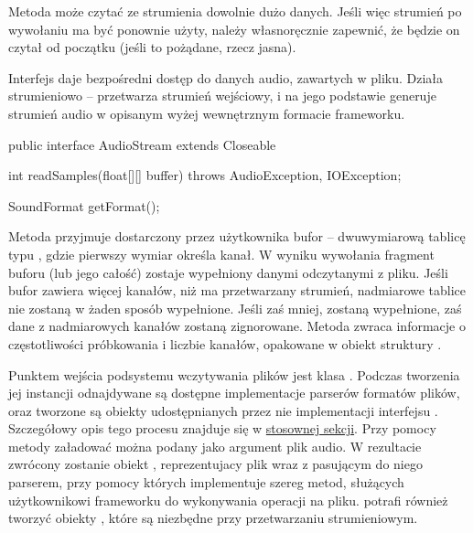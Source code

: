 \begin{Note}
Metoda  może czytać ze strumienia dowolnie dużo danych. Jeśli więc strumień po
wywołaniu ma być ponownie użyty, należy własnoręcznie zapewnić, że będzie on czytał od początku
(jeśli to pożądane, rzecz jasna).  
\end{Note}

Interfejs  daje bezpośredni dostęp do danych audio, zawartych w pliku. Działa
strumieniowo -- przetwarza strumień wejściowy, i na jego podstawie generuje strumień audio w
opisanym wyżej wewnętrznym formacie frameworku.

\begin{java}
public interface AudioStream extends Closeable {

    int readSamples(float[][] buffer) throws AudioException, IOException;

    SoundFormat getFormat();

}
\end{java}

Metoda  przyjmuje dostarczony przez użytkownika bufor -- dwuwymiarową tablicę typu
, gdzie pierwszy wymiar określa kanał. W wyniku wywołania fragment buforu (lub jego
całość) zostaje wypełniony danymi odczytanymi z pliku. Jeśli bufor zawiera więcej kanałów, niż ma
przetwarzany strumień, nadmiarowe tablice nie zostaną w żaden sposób wypełnione. Jeśli zaś mniej,
zostaną wypełnione, zaś dane z nadmiarowych kanałów zostaną zignorowane. Metoda 
zwraca informacje o częstotliwości próbkowania i liczbie kanałów, opakowane w obiekt struktury
.

Punktem wejścia podsystemu wczytywania plików jest klasa . Podczas tworzenia jej
instancji odnajdywane są dostępne implementacje parserów formatów plików, oraz tworzone są obiekty
udostępnianych przez nie implementacji interfejsu . Szczegółowy opis tego
procesu znajduje się w \hyperref[sec:odnajdywanie_implementacji]{stosownej sekcji}. Przy pomocy
metody  załadować można podany jako argument plik audio. W rezultacie zwrócony
zostanie obiekt , reprezentujacy plik wraz z pasującym do niego parserem, przy
pomocy których implementuje szereg metod, służących użytkownikowi frameworku do wykonywania operacji
na pliku.  potrafi również tworzyć obiekty , które są
niezbędne przy przetwarzaniu strumieniowym.

